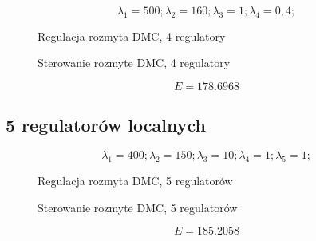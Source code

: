 \begin{equation}
{\lambda}_1 = 500; {\lambda}_2 = 160; {\lambda}_3 = 1; {\lambda}_4 = 0,4;
\end{equation}

\begin{figure}[H]
\centering

\caption{Regulacja rozmyta DMC, 4 regulatory}
\end{figure}

\begin{figure}[H]
\centering

\caption{Sterowanie rozmyte DMC, 4 regulatory}
\end{figure}

\begin{equation}
    E = \num{178,6968}
\end{equation}

\subsection{5 regulatorów localnych}

\begin{equation}
{\lambda}_1 = 400; {\lambda}_2 = 150; {\lambda}_3 = 10; {\lambda}_4 = 1; {\lambda}_5 = 1;
\end{equation}

\begin{figure}[H]
\centering

\caption{Regulacja rozmyta DMC, 5 regulatorów}
\end{figure}

\begin{figure}[H]
\centering

\caption{Sterowanie rozmyte DMC, 5 regulatorów}
\end{figure}

\begin{equation}
    E = \num{185,2058}
\end{equation}